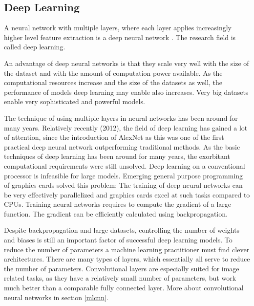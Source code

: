 \documentclass[draft,final,oneside]{vutinfth} %
\begin{document}
\subsection{Deep Learning} \label{dlbackground}

A neural network with multiple layers, where each layer applies increasingly higher level feature extraction is a deep neural network \cite{Goodfellow-et-al-2016}. The research field is called deep learning.

An advantage of deep neural networks is that they scale very well with the size of the dataset and with the amount of computation power available. As the computational resources increase and the size of the datasets as well, the performance of models deep learning may enable also increases. Very big datasets enable very sophisticated and powerful models.

The technique of using multiple layers in neural networks has been around for many years. Relatively recently (2012), the field of deep learning has gained a lot of attention, since the introduction of AlexNet \cite{alexnet} as this was one of the first practical deep neural network outperforming traditional methods. As the basic techniques of deep learning has been around for many years, the exorbitant computational requirements were still unsolved. Deep learning on a conventional processor is infeasible for large models. Emerging general purpose programming of graphics cards solved this problem: The training of deep neural networks can be very effectively parallelized and graphics cards excel at such tasks compared to CPUs. Training neural networks requires to compute the gradient of a large function. The gradient can be efficiently calculated using backpropagation. %

Despite backpropagation and large datasets, controlling the number of weights and biases is still an important factor of successful deep learning models. To reduce the number of parameters a machine learning practitioner must find clever architectures. There are many types of layers, which essentially all serve to reduce the number of parameters. Convolutional layers are especially suited for image related tasks, as they have a relatively small number of parameters, but work much better than a comparable fully connected layer. More about convolutional neural networks in section \ref{mlcnn}.
\end{document}
